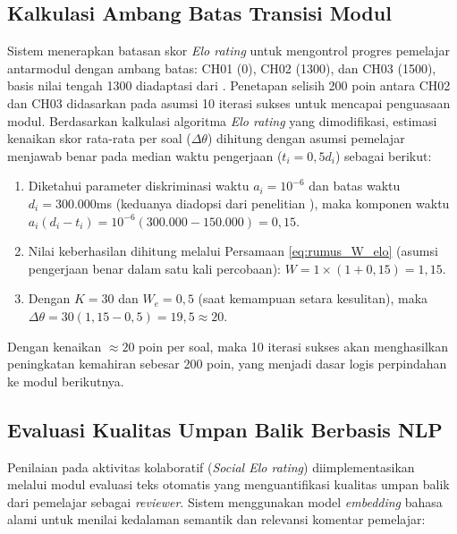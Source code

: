 \subsection{Kalkulasi Ambang Batas Transisi Modul}
Sistem menerapkan batasan skor \textit{Elo rating} untuk mengontrol progres pemelajar antarmodul dengan ambang batas: CH01 (0), CH02 (1300), dan CH03 (1500), basis nilai tengah 1300 diadaptasi dari \textcite{Vesin2022}. Penetapan selisih 200 poin antara CH02 dan CH03 didasarkan pada asumsi 10 iterasi sukses untuk mencapai penguasaan modul. Berdasarkan kalkulasi algoritma \textit{Elo rating} yang dimodifikasi, estimasi kenaikan skor rata-rata per soal ($\Delta\theta$) dihitung dengan asumsi pemelajar menjawab benar pada median waktu pengerjaan ($t_i = 0,5 d_i$) sebagai berikut:
\begin{enumerate}
    \item Diketahui parameter diskriminasi waktu $a_i = 10^{-6}$ dan batas waktu $d_i = 300.000$ms (keduanya diadopsi dari penelitian \textcite{Vesin2022}), maka komponen waktu $a_i(d_i - t_i) = 10^{-6}(300.000 - 150.000) = 0,15$.
    \item Nilai keberhasilan dihitung melalui Persamaan \ref{eq:rumus_W_elo} (asumsi pengerjaan benar dalam satu kali percobaan): $W = 1 \times (1 + 0,15) = 1,15$.
    \item Dengan $K=30$ dan $W_e=0,5$ (saat kemampuan setara kesulitan), maka $\Delta\theta = 30(1,15 - 0,5) = 19,5 \approx 20$.
\end{enumerate}
Dengan kenaikan $\approx 20$ poin per soal, maka 10 iterasi sukses akan menghasilkan peningkatan kemahiran sebesar 200 poin, yang menjadi dasar logis perpindahan ke modul berikutnya.

\subsection{Evaluasi Kualitas Umpan Balik Berbasis NLP}
Penilaian pada aktivitas kolaboratif (\textit{Social Elo rating}) diimplementasikan melalui modul evaluasi teks otomatis yang menguantifikasi kualitas umpan balik dari pemelajar sebagai \textit{reviewer}. Sistem menggunakan model \textit{embedding} bahasa alami untuk menilai kedalaman semantik dan relevansi komentar pemelajar:

